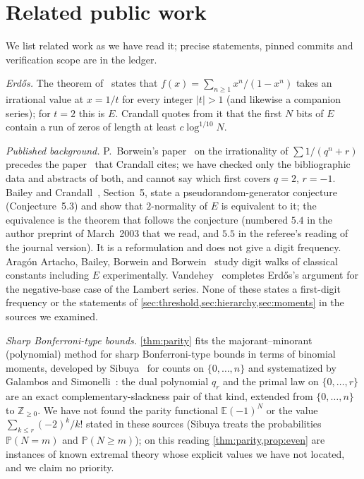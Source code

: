 \documentclass[11pt]{article}
\renewcommand{\Pr}{\mathbb P}
\newcommand{\Ex}{\mathbb E}
\begin{document}
\section{Related public work}\label{sec:related}

We list related work as we have read it; precise statements, pinned commits and verification scope are in the ledger.

\emph{Erd\H{o}s.} The theorem of~\cite{erdos1948} states that $f(x)=\sum_{n\ge1}x^n/(1-x^n)$ takes an irrational value at $x=1/t$ for every integer $|t|>1$ (and likewise a companion series); for $t=2$ this is $E$. Crandall quotes from it that the first $N$ bits of $E$ contain a run of zeros of length at least $c\log^{1/10}N$.

\emph{Published background.} P.~Borwein's paper~\cite{borwein1991} on the irrationality of $\sum1/(q^n+r)$ precedes the paper~\cite{borwein1992} that Crandall cites; we have checked only the bibliographic data and abstracts of both, and cannot say which first covers $q=2$, $r=-1$. Bailey and Crandall~\cite{baileycrandall2002}, Section~5, state a pseudorandom-generator conjecture (Conjecture~5.3) and show that $2$-normality of $E$ is equivalent to it; the equivalence is the theorem that follows the conjecture (numbered $5.4$ in the author preprint of March~2003 that we read, and $5.5$ in the referee's reading of the journal version). It is a reformulation and does not give a digit frequency. Arag\'on Artacho, Bailey, Borwein and Borwein~\cite{aabb2013} study digit walks of classical constants including $E$ experimentally. Vandehey~\cite{vandehey2013} completes Erd\H{o}s's argument for the negative-base case of the Lambert series. None of these states a first-digit frequency or the statements of \cref{sec:threshold,sec:hierarchy,sec:moments} in the sources we examined.

\emph{Sharp Bonferroni-type bounds.} \cref{thm:parity} fits the majorant--minorant (polynomial) method for sharp Bonferroni-type bounds in terms of binomial moments, developed by Sibuya~\cite{sibuya1991} for counts on $\{0,\dots,n\}$ and systematized by Galambos and Simonelli~\cite{gs1996}: the dual polynomial $q_r$ and the primal law on $\{0,\dots,r\}$ are an exact complementary-slackness pair of that kind, extended from $\{0,\dots,n\}$ to $\mathbb Z_{\ge0}$. We have not found the parity functional $\Ex(-1)^N$ or the value $\sum_{k\le r}(-2)^k/k!$ stated in these sources (Sibuya treats the probabilities $\Pr(N=m)$ and $\Pr(N\ge m)$); on this reading \cref{thm:parity,prop:even} are instances of known extremal theory whose explicit values we have not located, and we claim no priority.
\end{document}
